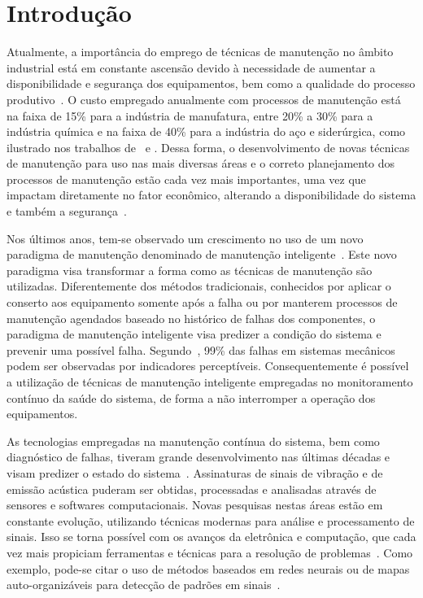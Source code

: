 \chapter{Introdução}

Atualmente, a importância do emprego de técnicas de manutenção no âmbito industrial está em
constante ascensão devido à necessidade de aumentar a disponibilidade e segurança dos equipamentos,
bem como a qualidade do processo produtivo~\cite{muller2008formalisation}. O custo empregado
anualmente com processos de manutenção está na faixa de 15\% para a indústria de manufatura, entre
20\% a 30\% para a indústria química e na faixa de 40\% para a indústria do aço e siderúrgica, como
ilustrado nos trabalhos de~\cite{chu1998predictive} e \cite{nguyen2008new}. Dessa forma, o
desenvolvimento de novas técnicas de manutenção para uso nas mais diversas áreas e o correto
planejamento dos processos de manutenção estão cada vez mais importantes, uma vez que impactam
diretamente no fator econômico, alterando a disponibilidade do sistema e também a
segurança~\cite{zhao2010soabased}.

Nos últimos anos, tem-se observado um crescimento no uso de um novo paradigma de manutenção
denominado de manutenção inteligente~\cite{zhang2013performance}. Este novo paradigma visa
transformar a forma como as técnicas de manutenção são utilizadas. Diferentemente dos métodos
tradicionais, conhecidos por aplicar o conserto aos equipamento somente após a falha ou por manterem
processos de manutenção agendados baseado no histórico de falhas dos componentes, o paradigma de
manutenção inteligente visa predizer a condição do sistema e prevenir uma possível falha.
Segundo~\cite{bloch2012machinery}, 99\% das falhas em sistemas mecânicos podem ser observadas por
indicadores perceptíveis. Consequentemente é possível a utilização de técnicas de manutenção
inteligente empregadas no monitoramento contínuo da saúde do sistema, de forma a não interromper a
operação dos equipamentos.

As tecnologias empregadas na manutenção contínua do sistema, bem como diagnóstico de falhas, tiveram
grande desenvolvimento nas últimas décadas e visam predizer o estado do
sistema~\cite{heng2009rotating}. Assinaturas de sinais de vibração e de emissão acústica puderam ser
obtidas, processadas e analisadas através de sensores e softwares computacionais. Novas pesquisas
nestas áreas estão em constante evolução, utilizando técnicas modernas para análise e processamento
de sinais. Isso se torna possível com os avanços da eletrônica e computação, que cada vez mais
propiciam ferramentas e técnicas para a resolução de problemas~\cite{zhao2010predictive}. Como
exemplo, pode-se citar o uso de métodos baseados em redes neurais ou de mapas auto-organizáveis para
detecção de padrões em sinais~\cite{goncalves2011fault}.

